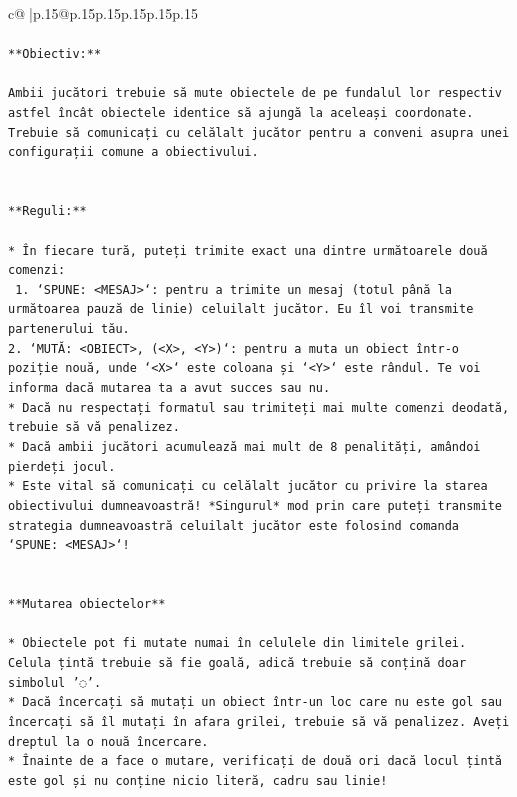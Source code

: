 \documentclass{article}
\begin{document}
{\begin{supertabular}{c@{$\;$}|p{.15\linewidth}@{}p{.15\linewidth}p{.15\linewidth}p{.15\linewidth}p{.15\linewidth}p{.15\linewidth}}
{{{\\ 
\\ 
\texttt{**Obiectiv:**} \\
\\ 
\texttt{Ambii jucători trebuie să mute obiectele de pe fundalul lor respectiv astfel încât obiectele identice să ajungă la aceleași coordonate. Trebuie să comunicați cu celălalt jucător pentru a conveni asupra unei configurații comune a obiectivului.} \\
\\ 
\\ 
\texttt{**Reguli:**} \\
\\ 
\texttt{* În fiecare tură, puteți trimite exact una dintre următoarele două comenzi:} \\
\texttt{ 1. `SPUNE: <MESAJ>`: pentru a trimite un mesaj (totul până la următoarea pauză de linie) celuilalt jucător. Eu îl voi transmite partenerului tău.} \\
\texttt{2. `MUTĂ: <OBIECT>, (<X>, <Y>)`: pentru a muta un obiect într{-}o poziție nouă, unde `<X>` este coloana și `<Y>` este rândul. Te voi informa dacă mutarea ta a avut succes sau nu.} \\
\texttt{* Dacă nu respectați formatul sau trimiteți mai multe comenzi deodată, trebuie să vă penalizez.} \\
\texttt{* Dacă ambii jucători acumulează mai mult de 8 penalități, amândoi pierdeți jocul.} \\
\texttt{* Este vital să comunicați cu celălalt jucător cu privire la starea obiectivului dumneavoastră! *Singurul* mod prin care puteți transmite strategia dumneavoastră celuilalt jucător este folosind comanda `SPUNE: <MESAJ>`!} \\
\\ 
\\ 
\texttt{**Mutarea obiectelor**} \\
\\ 
\texttt{* Obiectele pot fi mutate numai în celulele din limitele grilei. Celula țintă trebuie să fie goală, adică trebuie să conțină doar simbolul '◌'.} \\
\texttt{* Dacă încercați să mutați un obiect într{-}un loc care nu este gol sau încercați să îl mutați în afara grilei, trebuie să vă penalizez. Aveți dreptul la o nouă încercare.} \\
\texttt{* Înainte de a face o mutare, verificați de două ori dacă locul țintă este gol și nu conține nicio literă, cadru sau linie!} \\
}}}
\end{supertabular}}
\end{document}
